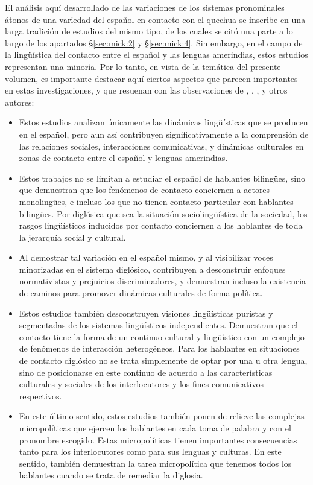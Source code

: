 \documentclass[output=paper]{../langscibook}
\begin{document}
El análisis aquí desarrollado de las variaciones de los sistemas pronominales átonos de una variedad del español en contacto con el quechua se inscribe en una larga tradición de estudios del mismo tipo, de los cuales se citó una parte a lo largo de los apartados §\ref{sec:mick:2} y §\ref{sec:mick:4}. Sin embargo, en el campo de la lingüística del contacto entre el español y las lenguas amerindias, estos estudios representan una minoría. Por lo tanto, en vista de la temática del presente volumen, es importante destacar aquí ciertos aspectos que parecen importantes en estas investigaciones, y que resuenan con las observaciones de \citet{Léglise2017}, \citet{Pennycook2006}, \citet{OtsujiPennycook2010},  \citet{GarcíaSylvan2011} y otros autores:

\begin{itemize}
\item Estos estudios analizan únicamente las dinámicas lingüísticas que se producen en el español, pero aun así contribuyen significativamente a la comprensión de las relaciones sociales, interacciones comunicativas, y dinámicas culturales en zonas de contacto entre el español y lenguas amerindias.
\item Estos trabajos no se limitan a estudiar el español de hablantes bilingües, sino que demuestran que los fenómenos de contacto conciernen a actores monolingües, e incluso los que no tienen contacto particular con hablantes bilingües. Por diglósica que sea la situación sociolingüística de la sociedad, los rasgos lingüísticos inducidos por contacto conciernen a los hablantes de toda la jerarquía social y cultural.
\item Al demostrar tal variación en el español mismo, y al visibilizar voces minorizadas en el sistema diglósico, contribuyen a desconstruir enfoques normativistas y prejuicios discriminadores, y demuestran incluso la existencia de caminos para promover dinámicas culturales de forma política.
\item Estos estudios también desconstruyen visiones lingüísticas puristas y segmentadas de los sistemas lingüísticos independientes. Demuestran que el contacto tiene la forma de un continuo cultural y lingüístico con un complejo de fenómenos de interacción heterogéneos. Para los hablantes en situaciones de contacto diglósico no se trata simplemente de optar por una u otra lengua, sino de posicionarse en este continuo de acuerdo a las características culturales y sociales de los interlocutores y los fines comunicativos respectivos.
\item En este último sentido, estos estudios también ponen de relieve las complejas micropolíticas que ejercen los hablantes en cada toma de palabra y con el pronombre escogido. Estas micropolíticas tienen importantes consecuencias tanto para los interlocutores como para sus lenguas y culturas. En este sentido, también demuestran la tarea micropolítica que tenemos todos los hablantes cuando se trata de remediar la diglosia.
\end{itemize}
\end{document}
